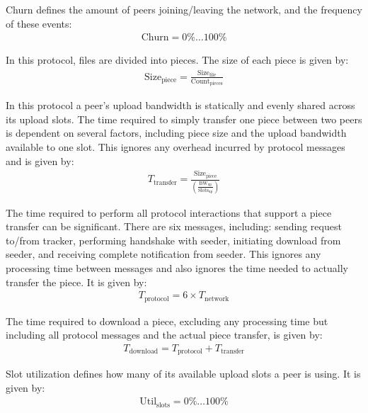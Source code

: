 \documentclass[a4paper,12pt,twocolumn]{article}
\begin{document}
Churn defines the amount of peers joining/leaving the network, and the frequency of these events:
\begin{eqnarray}
\label{eqn:churn}
  \text{Churn} = 0\% \dots 100\%
\end{eqnarray}

In this protocol, files are divided into pieces. The size of each piece is given by:
\begin{eqnarray}
\label{eqn:piece_size}
  \text{Size}_{\text{piece}}= \frac{\text{Size}_{\text{file}}}{\text{Count}_{\text{pieces}}}
\end{eqnarray}

In this protocol a peer's upload bandwidth is statically and evenly shared across its upload slots. The time required to simply transfer one piece between two peers is dependent on several factors, including piece size and the upload bandwidth available to one slot. This ignores any overhead incurred by protocol messages and is given by:
\begin{eqnarray}
\label{eqn:t_transfer}
  T_{\text{transfer}} = \frac{\text{Size}_{\text{piece}}}{\left(\frac{\text{BW}_{\text{up}}}{\text{Slots}_{\text{up}}}\right)}
\end{eqnarray}

The time required to perform all protocol interactions that support a piece transfer can be significant. There are six messages, including: sending request to/from tracker, performing handshake with seeder, initiating download from seeder, and receiving complete notification from seeder. This ignores any processing time between messages and also ignores the time needed to actually transfer the piece. It is given by:
\begin{eqnarray}
\label{eqn:t_protocol}
  T_{\text{protocol}} = 6 \times T_{\text{network}}
\end{eqnarray}

The time required to download a piece, excluding any processing time but including all protocol messages and the actual piece transfer, is given by:
\begin{eqnarray}
\label{eqn:t_download}
  T_{\text{download}}=T_{\text{protocol}} + T_{\text{transfer}}
\end{eqnarray}

Slot utilization defines how many of its available upload slots a peer is using. It is given by:
\begin{eqnarray}
\label{eqn:utilization_slot}
  \text{Util}_{\text{slots}} = 0\% \dots 100\%
\end{eqnarray}
\end{document}
